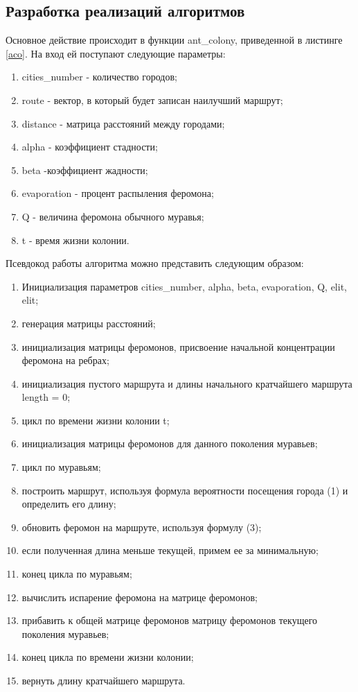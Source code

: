 \documentclass[a4paper, 14pt]{article}
\begin{document}
	\subsection{Разработка реализаций алгоритмов}
	Основное действие происходит в функции ant\_colony, приведенной в листинге \ref{aco}. На вход ей поступают следующие параметры:
	\begin{enumerate}
	 \item  cities\_number - количество городов;
    \item route - вектор, в который будет записан наилучший маршрут;
    \item distance - матрица расстояний между городами;
    \item  alpha -  коэффициент стадности;
    \item  beta -коэффициент жадности;
     \item evaporation - процент распыления феромона;
     \item  Q - величина феромона обычного муравья;
    \item  t - время жизни колонии.
    \end{enumerate}
    
 Псевдокод работы алгоритма можно представить следующим образом:
 
\begin{enumerate}
	 \item  Инициализация параметров cities\_number,  alpha, beta, evaporation, Q, elit, elit;
    \item генерация матрицы расстояний;
    \item инициализация матрицы феромонов, присвоение начальной концентрации феромона на ребрах;
    \item  инициализация пустого маршрута и длины начального кратчайшего маршрута length = 0;
    \item  цикл по времени жизни колонии t;
     \item инициализация матрицы феромонов для данного поколения муравьев;
      \item  цикл по муравьям;
     \item  построить маршрут, используя формула вероятности посещения города (1) и определить его длину;
      \item обновить феромон на маршруте, используя формулу (3);
    \item  если полученная длина меньше текущей, примем ее за минимальную;
    \item  конец цикла по муравьям;
    \item  вычислить испарение феромона на матрице феромонов;
     \item  прибавить к общей матрице феромонов матрицу феромонов текущего поколения муравьев;
     \item конец цикла по времени жизни колонии;
     \item вернуть длину кратчайшего маршрута.
    \end{enumerate}
    
\end{document}
